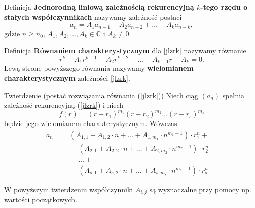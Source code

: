 \documentclass[a4paper,10pt]{beamer}
\begin{document}
\begin{frame}
	
	\begin{block}{Definicja}
		{\bf Jednorodną liniową zależnością rekurencyjną $k$-tego rzędu o stałych współczynnikach} nazywamy zależność postaci
		\begin{equation}\label{jlzrk}
			a_n=A_1a_{n-1}+A_2a_{n-2}+\ldots+A_ka_{n-k},
		\end{equation}
		gdzie $n\geq n_0$, $A_1,A_2,\ldots,A_k\in\mathbb{C}$ i $A_k\neq0$.
	\end{block}
	
	\begin{block}{Definicja}
		{\bf Równaniem charakterystycznym} dla \eqref{jlzrk} nazywamy równanie $$r^k-A_1r^{k-1}-A_2r^{k-2}-\ldots-A_{k-1}r-A_k=0.$$
		Lewą stronę powyższego równania nazywamy {\bf wielomianem charakterystycznym} zależności \eqref{jlzrk}.
	\end{block}
	
\end{frame}



\begin{frame}
	
	\begin{block}{Twierdzenie (postać rozwiązania równania (\ref{jlzrk}))}
		Niech ciąg $(a_n)$ spełnia zależność rekurencyjną (\ref{jlzrk}) i niech
		$$f(r)=(r-r_1)^{m_1}(r-r_2)^{m_2}\ldots(r-r_s)^{m_s}$$
		będzie jego wielomianem charakterystycznym. Wówczas
		\begin{align*}
			a_n=&\,(A_{1,1}+A_{1,2}\cdot n+\ldots+A_{1,m_1}\cdot n^{m_1-1})\cdot r_1^n+\\
			&\,+(A_{2,1}+A_{2,2}\cdot n+\ldots+A_{2,m_2}\cdot n^{m_2-1})\cdot r_2^n+\\
			&\,+\ldots+\\
			&\,+(A_{s,1}+A_{s,2}\cdot n+\ldots+A_{s,m_s}\cdot n^{m_s-1})\cdot r_s^n
		\end{align*}
	\end{block}
	
	W powyższym twierdzeniu współczynniki $A_{i,j}$ są wyznaczalne przy pomocy np. wartości początkowych.
	
\end{frame}
\end{document}
